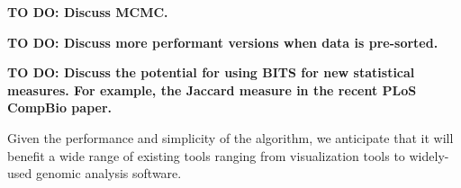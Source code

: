 \documentclass{bioinfo}
\begin{document}
        \textbf{TO DO: Discuss MCMC.}
        
        \textbf{TO DO: Discuss more performant versions when data is pre-sorted.}

        \textbf{TO DO: Discuss the potential for using BITS for new statistical measures.  For
        example, the Jaccard measure in the recent PLoS CompBio paper.}
        
        Given the performance and simplicity of the algorithm, we
        anticipate that it will benefit a wide range of existing tools ranging from
        visualization tools to widely-used genomic analysis software.

        
        
\end{document}
